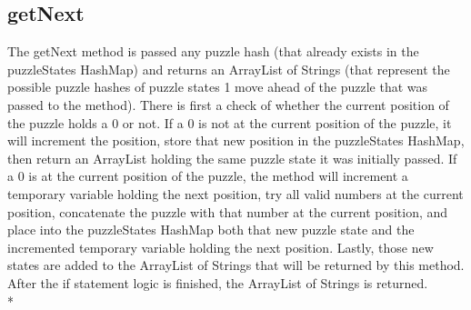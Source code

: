\documentclass[conference]{IEEEtran}
\begin{document}
\subsection{getNext}
The getNext method is passed any puzzle hash (that already exists in the puzzleStates HashMap) and returns an ArrayList of Strings (that represent the possible puzzle hashes of puzzle states 1 move ahead of the puzzle that was passed to the method). There is first a check of whether the current position of the puzzle holds a 0 or not. If a 0 is not at the current position of the puzzle, it will increment the position, store that new position in the puzzleStates HashMap, then return an ArrayList holding the same puzzle state it was initially passed. If a 0 is at the current position of the puzzle, the method will increment a temporary variable holding the next position, try all valid numbers at the current position, concatenate the puzzle with that number at the current position, and place into the puzzleStates HashMap both that new puzzle state and the incremented temporary variable holding the next position. Lastly, those new states are added to the ArrayList of Strings that will be returned by this method. After the if statement logic is finished, the ArrayList of Strings is returned.
\\*
\end{document}

